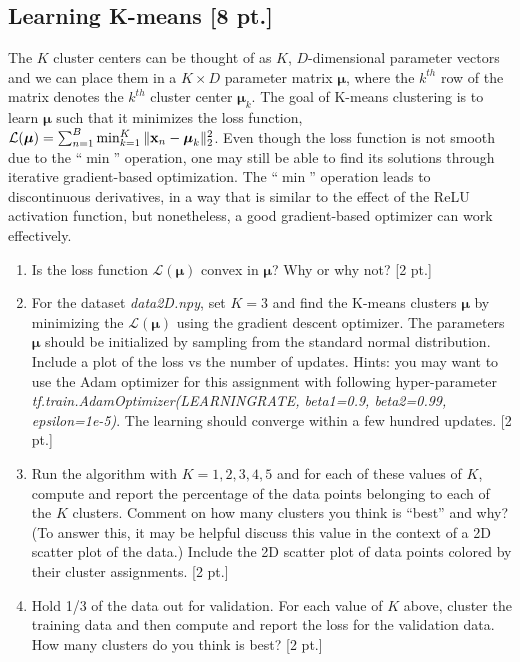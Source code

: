 \documentclass[12pt,letterpaper]{article}
\begin{document}
\subsection{Learning K-means [8 pt.]}

The $K$ cluster centers can be thought of as $K$, $D$-dimensional parameter vectors and we can place them in a $K \times D$ parameter matrix $\boldsymbol{\mu}$, where the $k^{th}$ row of the matrix denotes the $k^{th}$ cluster center $\boldsymbol{\mu}_k$. The goal of K-means clustering is to learn $\boldsymbol{\mu}$ such that it minimizes the loss function, $\mathcal{L}(\boldsymbol{\mu}) = \sum_{n=1}^B \min_{k=1}^K \|\bold{x}_n - \boldsymbol{\mu}_k\|_2^2$. Even though the loss function is not smooth due to the ``$\min$'' operation, one may still be able to find its solutions through iterative gradient-based optimization. The ``$\min$'' operation leads to discontinuous derivatives, in a way that is similar to the effect of the ReLU activation function, but nonetheless, a good gradient-based optimizer can work effectively.   

\begin{enumerate}
\item Is the loss function $\mathcal{L}(\boldsymbol{\mu})$ convex in $\boldsymbol{\mu}$? Why or why not? [2 pt.] 
\item For the dataset \textit{data2D.npy}, set $K=3$ and find the K-means clusters $\boldsymbol{\mu}$ by minimizing the $\mathcal{L}(\boldsymbol{\mu})$ using the gradient descent optimizer. The parameters $\boldsymbol{\mu}$ should be initialized by sampling from the standard normal distribution. Include a plot of the loss vs the number of updates. Hints: you may want to use the Adam optimizer for this assignment with following hyper-parameter \textit{tf.train.AdamOptimizer(LEARNINGRATE, beta1=0.9, beta2=0.99, epsilon=1e-5)}. The learning should converge within a few hundred updates. [2 pt.] 
\item Run the algorithm with $K={1,2,3,4,5}$ and for each of these values of $K$, compute and report the percentage of the data points belonging to each of the $K$ clusters. Comment on how many clusters you think is ``best'' and why? (To answer this, it may be helpful discuss this value in the context of a 2D scatter plot of the data.) Include the 2D scatter plot of data points colored by their cluster assignments. [2 pt.] 
\item Hold 1/3 of the data out for validation. For each value of $K$ above, cluster the training data and then compute and report the loss for the validation data. How many clusters do you think is best? [2 pt.]
\end{enumerate}
\end{document}
